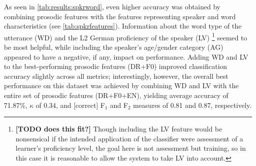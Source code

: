 \documentclass[a4paper]{article}
\newcommand{\TODO}[1]{{\color{red}\textbf{[TODO #1]}}}
\begin{document}
		As seen in \cref{tab:results:spkrword}, even higher accuracy was obtained by combining prosodic features with the features representing speaker and word characteristics (see \cref{tab:spkrfeatures}). Information about the word type of the utterance (WD) and the L2 German proficiency of the speaker (LV)%
		\footnote{\TODO{does this fit?} Though including the LV feature would be nonsensical if the intended application of the classifier were assessment of a learner's proficiency level, the goal here is not assessment but training, 
		so in this case it is reasonable to allow the system to take LV into account. }		
		 seemed to be most helpful, while including the speaker's age/gender category (AG) appeared to have a negative, if any, impact on performance. 
		Adding WD and LV to the best-performing prosodic features (DR+F0) improved classification accuracy slightly across all metrics; interestingly, however, the overall best performance on this dataset was achieved by combining WD and LV with the entire set of prosodic features (DR+F0+EN), yielding average accuracy of 71.87\%, $\kappa$ of 0.34, and [correct] F$_1$ and F$_2$ measures of 0.81 and 0.87, respectively.
		
\end{document}
